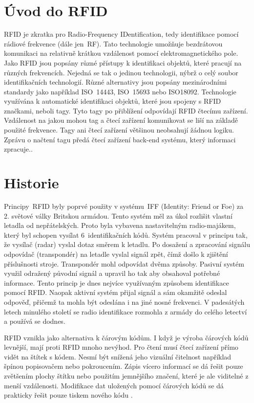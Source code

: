 \section{Úvod do RFID}
RFID je zkratka pro {Radio-Frequency IDentification}, tedy identifikace pomocí rádiové frekvence (dále jen~RF). Tato technologie umožňuje bezdrátovou komunikaci na relativně krátkou vzdálenost pomocí elektromagnetického pole. Jako RFID jsou popsány různé přístupy k identifikaci objektů, které pracují na různých frekvencích. Nejedná se tak o jedinou technologii, nýbrž o celý soubor identifikačních technologií. Různé alternativy jsou popsány mezinárodními standardy jako například ISO~14443, ISO~15693 nebo ISO18092. Technologie využívána k automatické identifikaci objektů, které jsou spojeny s RFID značkami, neboli tagy. Tyto tagy po přiblížení odpovídají RFID čtecímu zařízení. Vzdálenost na jakou mohou tag a čtecí zařízení komunikovat se liší na základě použité frekvence. Tagy ani čtecí zařízení většinou neobsahují žádnou logiku. Zprávu o načtení tagu předá čtecí zařízení {back-end} systému, který informaci zpracuje.\cite{The_RF_in_RFID}.\par
\par

\section{Historie}
Principy~RFID byly poprvé použity v systému~IFF (Identity: Friend or Foe) za 2. světové války Britskou armádou. Tento systém měl za úkol rozlišit vlastní letadla od nepřátelských. Proto byla vybavena nastavitelným {radio-majákem}, který byl schopen vysílat 6~identifikačních kódů. Systém pracoval v principu tak, že vysílač (radar) vyslal dotaz směrem k letadlu. Po dosažení a zpracování signálu odpovídač (transpondér) na letadle vyslal signál zpět, čímž došlo k zjištění příslušnosti stroje. Transpondér mohl odpovídat dvěma způsoby. Pasivní systém využil odražený původní signál a upravil ho tak aby obsahoval potřebné informace. Tento princip je dnes nejvíce využívaným způsobem identifikace pomocí RFID. Naopak aktivní systém přijal signál a sám okamžitě odeslal odpověď, přičemž ta mohla být odeslána i na jiné nosné frekvenci. V padesátých letech minulého století se radio identifikace rozmohla z armády do celého letectví a používá se dodnes. %
\par
RFID vznikla jako alternativa k čárovým kódům. I když je výroba čárových kódů levnější, mají proti RFID mnoho nevýhod. Pro čtení musí čtecí zařízení přímo vidět na štítek s kódem. Nesmí být snížená jeho vizuální čitelnost například špínou popisovačem nebo pokroucením. Zápis vícero informací se dá řešit pouze zvětšením plochy štítku nebo použitím jemnějšího značení, které je ale viditelné z menší vzdálenosti. Modifikace dat uložených pomocí čárových kódů se dá prakticky řešit pouze tiskem nového kódu \cite{The_RF_in_RFID}\cite{Emulator_UHD_RFID_Tagu}.

